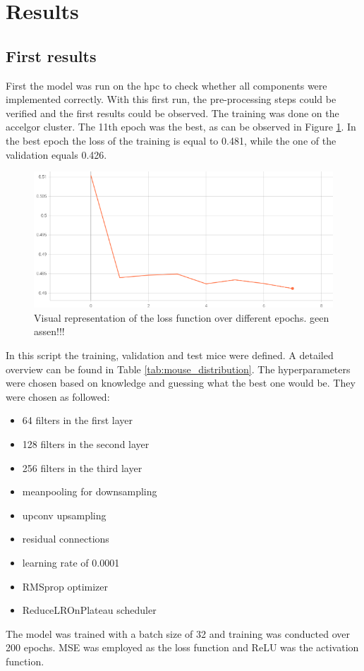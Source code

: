 \documentclass[twocolumn]{article}
\begin{document}
\section{Results}
\subsection{First results}
First the model was run on the hpc to check whether all components were implemented correctly. 
With this first run, the pre-processing steps could be verified and the first results could be observed. 
The training was done on the accelgor cluster. 
The 11th epoch was the best, as can be observed in Figure \ref{fig:first_loss}.
In the best epoch the loss of the training is equal to 0.481, while the one of the validation equals 0.426.

\begin{figure}
    \centering
    \includegraphics[width=1\linewidth]{First_results_loss.png}
    \caption{Visual representation of the loss function over different epochs. geen assen!!!}
    \label{fig:first_loss}
\end{figure}

In this script the training, validation and test mice were defined. A detailed overview can be found in Table \ref{tab:mouse_distribution}.
The hyperparameters were chosen based on knowledge and guessing what the best one would be. They were chosen as followed:
\begin{itemize}
    \item 64 filters in the first layer
    \item 128 filters in the second layer
    \item 256 filters in the third layer
    \item meanpooling for downsampling
    \item upconv upsampling
    \item residual connections
    \item learning rate of 0.0001
    \item RMSprop optimizer
    \item ReduceLROnPlateau scheduler
\end{itemize}
The model was trained with a batch size of 32 and training was conducted over 200 epochs. MSE was employed as the loss function and ReLU was the activation function.
\end{document}
